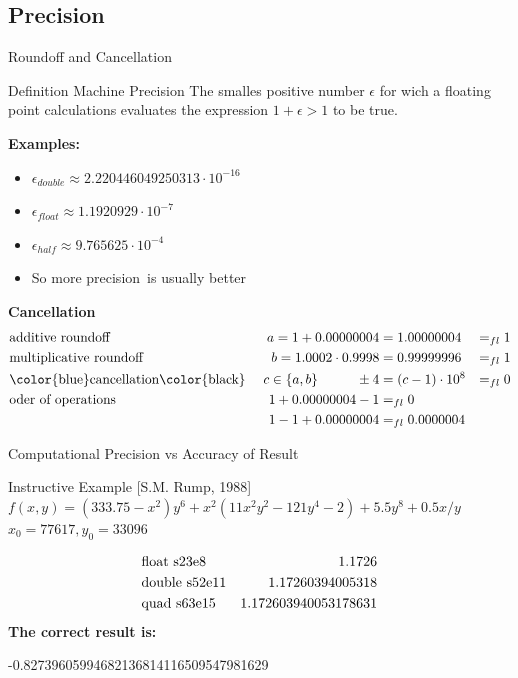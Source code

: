 \documentclass[10pt]{beamer}
\begin{document}
\subsection{Precision}
\begin{frame}{Roundoff and Cancellation}

\begin{block}{Definition Machine Precision}
The smalles positive number $\epsilon$ for wich a floating point 
calculations evaluates the expression $1 + \epsilon > 1$ to be true.
\end{block}

\textbf{Examples:}
\begin{itemize}
\item $\epsilon_{double} \approx 2.220446049250313\cdot 10^{-16}$
\item $\epsilon_{float} \approx 1.1920929\cdot 10^{-7}$
\item $\epsilon_{half} \approx 9.765625\cdot 10^{-4}$
\item So \color{red}more precision\color{black}~is usually \color{red}better
\end{itemize}
\textbf{Cancellation}
\begin{align*}
&\text{additive roundoff } & a=1+0.00000004 &= 1.00000004 &=_{fl} 1\\
&\text{multiplicative roundoff } & b = 1.0002 \cdot 0.9998 &=0.99999996 &=_{fl} 1\\
&\text{\color{blue}cancellation\color{black}~}  &c\in \lbrace a,b\rbrace 
\hspace{1cm}\pm 4 &= (c-1)\cdot 10^8 &=_{fl} 0 \\
&\text{oder~of~operations}  & 1+0.00000004 -1 &=_{fl} 0\\
& &1-1 + 0.00000004 &=_{fl} 0.0000004
\end{align*}
\end{frame}


\begin{frame}{Computational Precision vs Accuracy of Result}
\begin{block}{Instructive Example [S.M. Rump, 1988]}
$f(x,y) = (333.75 - x^2)y^6 + x^2(11x^2y^2 - 121y^4-2) + 5.5y^8 + 0.5x/y$\\
$x_0 = 77617, y_0 = 33096$
\end{block}
\begin{align*}
&\text{float s23e8} \hfill &1.1726\\
&\text{double s52e11} \hfill &1.17260394005318\\
&\text{quad s63e15} \hfill &1.172603940053178631
\end{align*}
\textbf{The correct result is:}\\
\begin{center}
\color{red}-0.82739605994682136814116509547981629\color{black}
\end{center}
\end{frame}
\end{document}
